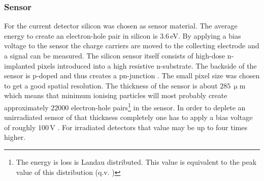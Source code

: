 \subsubsection{Sensor}\label{s220}
For the current detector silicon was chosen as sensor material. The average energy to create an electron-hole pair in silicon is $3.6\,$eV. By applying a bias voltage to the sensor the charge carriers are moved to the collecting electrode and a signal can be measured. The silicon sensor itself consists of high-dose n-implanted pixels introduced into a high resistive n-substrate. The backside of the sensor is p-doped and thus creates a pn-junction \cite{allkofer}. The small pixel size was chosen to get a good spatial resolution. The thickness of the sensor is about $285\,\upmu$m which means that minimum ionising particles will most probably create approximately $22000$ electron-hole pairs\footnote{The energy is loss is Landau distributed. This value is equivalent to the peak value of this distribution (q.v. )} in the sensor. In order to deplete an unirradiated sensor of that thickness completely one has to apply a bias voltage of roughly $100\,$V \cite{pixadd}. For irradiated detectors that value may be up to four times higher.
